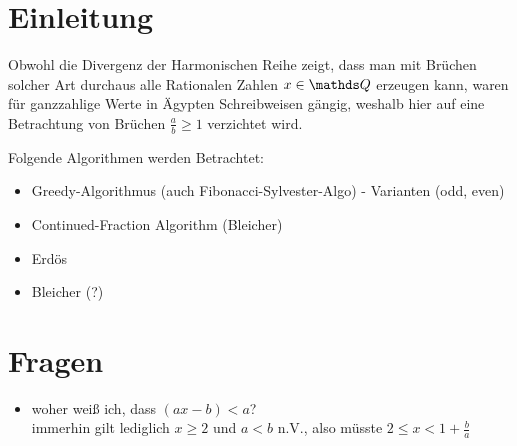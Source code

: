 \section{Einleitung}

Obwohl die Divergenz der Harmonischen Reihe zeigt, dass man mit Brüchen solcher Art durchaus alle Rationalen Zahlen $x \in \Q$ erzeugen kann, waren für ganzzahlige Werte in Ägypten Schreibweisen gängig, weshalb hier auf eine Betrachtung von Brüchen $\frac{a}{b} \geq 1$ verzichtet wird.

Folgende Algorithmen werden Betrachtet:
\begin{itemize}
	\item Greedy-Algorithmus (auch Fibonacci-Sylvester-Algo)
		\subitem - Varianten (odd, even)
	\item Continued-Fraction Algorithm (Bleicher)
	\item Erdös
	\item Bleicher (?)
\end{itemize}

\section*{Fragen}
\begin{itemize}
	\item woher weiß ich, dass $(ax-b)<a$?\\ immerhin gilt lediglich $x \geq 2$ und $a<b$ n.V., also müsste $2 \leq x < 1+\frac{b}{a}$
\end{itemize}